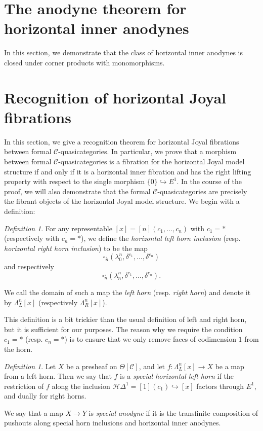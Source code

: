 \documentclass{amsart}
\numberwithin{equation}{section}
\theoremstyle{plain}   %
\theoremstyle{remark}
\newtheorem{defn}[subsection]{Definition}
\theoremstyle{plain}
\newcommand{\C}{\ensuremath{\mathcal{C}}}
\begin{document}
\section{The anodyne theorem for horizontal inner anodynes}\label{horizontal}
In this section, we demonstrate that the class of horizontal inner anodynes is closed under corner products with monomorphisms.
\section{Recognition of horizontal Joyal fibrations}\label{admissible}
In this section, we give a recognition theorem for horizontal Joyal fibrations between formal \(\C\)-quasicategories.  In particular, we prove that a morphism between formal \(\C\)-quasicategories is a fibration for the horizontal Joyal model structure if and only if it is a horizontal inner fibration and has the right lifting property with respect to the single morphism \(\{0\}\hookrightarrow E^1\). In the course of the proof, we will also demonstrate that the formal \(\C\)-quasicategories are precisely the fibrant objects of the horizontal Joyal model structure.  We begin with a definition:

\begin{defn}
	For any representable \([x]=[n](c_1,\dots,c_n)\) with \(c_1=\ast\) (respectively with \(c_n=\ast\)), we define the \emph{horizontal left horn inclusion} (resp. \emph{horizontal right horn inclusion}) to be the map \[\square^\lrcorner_n(\lambda^n_0,\delta^{c_1}, \dots, \delta^{c_n})\] and respectively \[\square^\lrcorner_n(\lambda^n_n,\delta^{c_1}, \dots, \delta^{c_n}).\]

	We call the domain of such a map the \emph{left horn} (resp. \emph{right horn}) and denote it by \(\Lambda^n_L[x]\) (respectively \(\Lambda^n_R[x]\)).
\end{defn}

This definition is a bit trickier than the usual definition of left and right horn, but it is sufficient for our purposes. The reason why we require the condition \(c_1=\ast\) (resp. \(c_n=\ast\)) is to ensure that we only remove faces of codimension \(1\) from the horn.

\begin{defn}
	Let \(X\) be a presheaf on \(\Theta[\C]\), and let \(f:\Lambda^n_L[x]\to X\) be a map from a left horn.  Then we say that \(f\) is a \emph{special horizontal left horn} if the restriction of \(f\) along the inclusion \(\mathscr{H}\Delta^1=[1](c_1)\hookrightarrow [x]\) factors through \(E^1\), and dually for right horns.

	We say that a map \(X\to Y\) is \emph{special anodyne} if it is the transfinite composition of pushouts along special horn inclusions and horizontal inner anodynes.
\end{defn}
\end{document}

